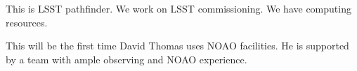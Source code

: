 \documentclass[11pt]{article}
\begin{document}
\otherfacilities

This is LSST pathfinder. We work on LSST commissioning. We have computing resources.


%
%
%
%
%


%

\thepast

This will be the first time David Thomas uses NOAO facilities. He is supported by a team with ample observing and NOAO experience. 


%



%
\end{document}
